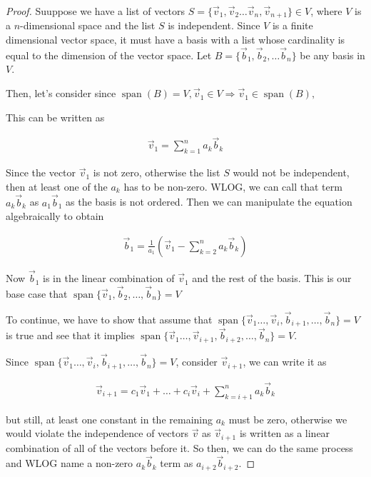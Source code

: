 \documentclass{article}
\DeclareMathOperator{\spn}{span}
\begin{document}
\begin{proof}
Suuppose we have a list of vectors $S = \{\vec{v}_1, \vec{v}_2 \ldots \vec{v}_n, \vec{v}_{n+1} \} \in V$, where $V$ is a $n$-dimensional space and the list $S$ is independent. Since $V$ is a finite dimensional vector space, it must have a basis with a list whose cardinality is equal to the dimension of the vector space. Let $B = \{ \vec{b}_1, \vec{b}_2 ,\ldots \vec{b}_n \}$ be any basis in $V$.

Then, let's consider since $\spn(B) = V, \vec{v}_1 \in V \Rightarrow \vec{v}_1 \in \spn(B), $

This can be written as 

\begin{align*}
\vec{v}_1 = \sum_{k=1}^{n} a_k \vec{b}_k
\end{align*}

Since the vector $\vec{v}_1$ is not zero, otherwise the list $S$ would not be independent, then at least one of the $a_k$ has to be non-zero. WLOG, we can call that term $a_k \vec{b}_k$ as $a_1 \vec{b}_1$ as the basis is not ordered. Then we can manipulate the equation algebraically to obtain

\begin{align*}
\vec{b}_1 = \frac{1}{a_1}(\vec{v}_1 - \sum_{k=2}^{n} a_k \vec{b}_k)
\end{align*}

Now $\vec{b}_1$ is in the linear combination of $\vec{v}_1$ and the rest of the basis. This is our base case that $\spn{\{\vec{v}_1, \vec{b}_2 ,\ldots , \vec{b}_n\}} = V$

To continue, we have to show that assume that $\spn{\{ \vec{v}_1 \ldots, \vec{v}_i , \vec{b}_{i+1}, \ldots, \vec{b}_n \}}=V$ is true and see that it implies $\spn{\{ \vec{v}_1 \ldots, \vec{v}_{i+1} , \vec{b}_{i+2}, \ldots, \vec{b}_n \}}=V$.

Since $\spn{\{ \vec{v}_1 \ldots, \vec{v}_i , \vec{b}_{i+1}, \ldots, \vec{b}_n \}}=V$, consider $\vec{v}_{i+1}$, we can write it as

\begin{align*}
\vec{v}_{i+1} = c_1 \vec{v}_1 + \ldots + c_i \vec{v}_{i} + \sum_{k=i+1}^{n} a_k \vec{b}_k
\end{align*}

but still, at least one constant in the remaining $a_k$ must be zero, otherwise we would violate the independence of vectors $\vec{v}$ as $\vec{v}_{i+1}$ is written as a linear combination of all of the vectors before it. So then, we can do the same process and WLOG name a non-zero $a_k \vec{b}_k$ term as $a_{i+2} \vec{b}_{i+2}$.


\end{proof}
\end{document}
